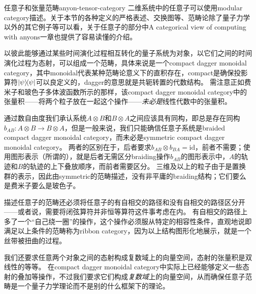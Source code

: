 \begin{back}{任意子和张量范畴}{anyon-tensor-category}
    二维系统中的任意子可以使用modular category描述。关于本节的各种定义的严格表述、交换图等、范畴论除了量子力学以外的其它例子等可以看\cite{beer2018categories}，关于任意子的部分\cite{new_structures}中A categorical view of computing with anyons一章也提供了容易读懂的介绍。
    
    以彼此能够通过某些时间演化过程相互转化的量子系统为对象，以它们之间的时间演化过程为态射，可以组成一个范畴，具体来说是一个compact dagger monoidal category，其中monoidal代表某种范畴论意义下的直积存在，compact是确保投影算符$\dyad{\psi}$可以良定义的，dagger的意思就是共轭转置的代数结构。
    需注意正如费米子和玻色子多体波函数所示的那样，该compact dagger monoidal category中的张量积——将两个粒子放在一起这个操作——\emph{未必是}线性代数中的张量积。

    通过数自由度我们承认系统$A \otimes B$和$B \otimes A$之间应该具有同构，即总是存在同构$b_{AB} :A \otimes B \to B \otimes A$，但是一般来说，我们只能确信任意子系统是braided compact dagger monoidal category，而未必是symmetric compact dagger monoidal category。
    两者的区别在于，后者要求$b_{AB} \otimes b_{BA} = \mathrm{id}$，前者不需要；使用图形表示（所谓的），就是后者无需区分braiding操作$b_{AB}$的图形表示中，$A$的轨迹和$B$的轨迹的上下叠放顺序，而前者需要区分。
    三维及以上的粒子由于是置换群的表示，因此由symmetric的范畴描述，没有非平庸的braiding结构；它们要么是费米子要么是玻色子。

    描述任意子的范畴还必须将任意子的有自相交的路径和没有自相交的路径区分开——或者说，需要将闭弦算符并非恒等算符这件事考虑在内。
    有自相交的路径上多了一个“自己绕一圈”的操作，这个操作必须服从特定的相容性条件，直观地说即 %
    满足以上条件的范畴称为ribbon category，因为以上结构图形化地展示，就是一个丝带被扭曲的过程。

    我们还要求任意两个对象之间的态射构成复数域上的向量空间，态射的张量积是双线性的等等。
    在compact dagger monoidal category中实际上已经能够定义一些态射的叠加等操作，不过我们要求它们构成\emph{复数域}上的向量空间，从而确保任意子范畴是一个量子力学理论而不是别的什么框架下的理论。


\end{back}
